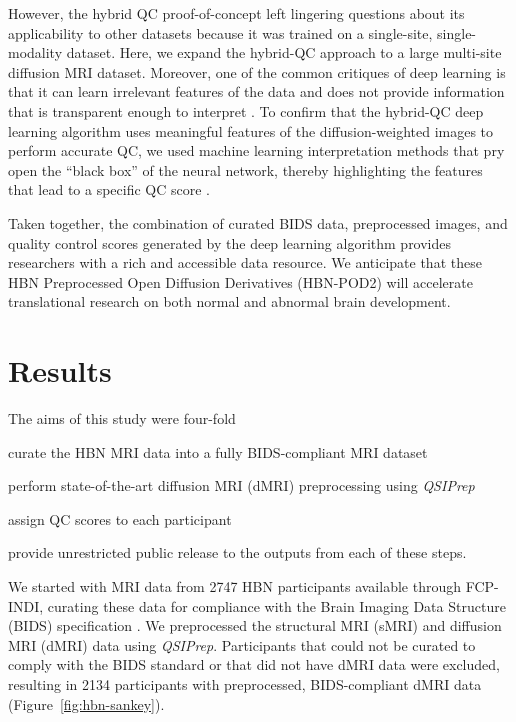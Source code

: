 \documentclass[9pt,lineno]{elife}
\begin{document}
However, the hybrid QC proof-of-concept left lingering questions about its
applicability to other datasets because it was trained on a single-site,
single-modality dataset. Here, we expand the hybrid-QC approach to a large
multi-site diffusion MRI dataset. Moreover, one of the common critiques of deep
learning is that it can learn irrelevant features of the data and does not
provide information that is transparent enough to interpret
\citep{lipton2017doctor, salahuddin2022transparency, Zech2018-ki}. To confirm
that the hybrid-QC deep learning algorithm uses meaningful features of the
diffusion-weighted images to perform accurate QC, we used machine learning
interpretation methods that pry open the ``black box'' of the neural network, thereby
highlighting the features that lead to a specific QC score
\citep{sundararajan2017axiomatic,murdoch2019definitions}.

Taken together, the combination of curated BIDS data, preprocessed images, and quality control scores generated by the deep learning algorithm provides researchers with a rich and accessible data resource. We anticipate that these HBN Preprocessed Open Diffusion Derivatives (HBN-POD2) will accelerate translational research on both normal and abnormal brain development.

\section{Results}

The aims of this study were four-fold
\begin{enumerate*}[%
    label=(\roman*),%
    before=\unskip{: },%
    itemjoin={{, }},%
    itemjoin*={{, and }}]
    \item curate the HBN MRI data into a fully BIDS-compliant MRI dataset
    \item perform state-of-the-art diffusion MRI (dMRI) preprocessing using \emph{QSIPrep}
    \item assign QC scores to each participant
    \item provide unrestricted public release to the outputs from each of these
    steps.
\end{enumerate*}
We started with MRI data from \num{2747} HBN participants available through FCP-INDI,
curating these data for compliance with the Brain Imaging Data Structure
(BIDS) specification \citep{gorgolewski2016-lh}. We  preprocessed the structural
MRI (sMRI) and diffusion MRI (dMRI) data using \emph{QSIPrep}. Participants that
could not be curated to comply with the BIDS standard or that did not have dMRI
data were excluded, resulting in \num{2134} participants with preprocessed,
BIDS-compliant dMRI data (Figure~\ref{fig:hbn-sankey}).
\end{document}
